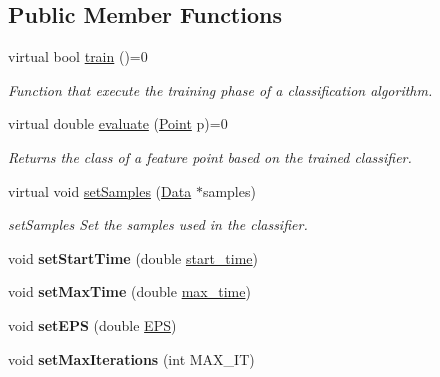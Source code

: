\subsection*{Public Member Functions}
\begin{DoxyCompactItemize}
\item 
virtual bool \hyperlink{class_classifier_a2306a5de27555ab093593ac9642bc7d9}{train} ()=0
\begin{DoxyCompactList}\small\item\em Function that execute the training phase of a classification algorithm. \end{DoxyCompactList}\item 
virtual double \hyperlink{class_classifier_ae8e9554823b85ddc2dcad2955da811d9}{evaluate} (\hyperlink{class_point}{Point} p)=0
\begin{DoxyCompactList}\small\item\em Returns the class of a feature point based on the trained classifier. \end{DoxyCompactList}\item 
virtual void \hyperlink{class_classifier_a4b16736670cba8f4c8397b6a90c8c799}{set\+Samples} (\hyperlink{class_data}{Data} $\ast$samples)
\begin{DoxyCompactList}\small\item\em set\+Samples Set the samples used in the classifier. \end{DoxyCompactList}\item 
\mbox{\label{class_classifier_a7f1cf3ac53b0593307a050368a912bb4}} 
void {\bfseries set\+Start\+Time} (double \hyperlink{class_classifier_a4488a20bd7b4fc22d57244aaee57b002}{start\+\_\+time})
\item 
\mbox{\label{class_classifier_a5da324a0de94b7171484f3b1f1f22fbd}} 
void {\bfseries set\+Max\+Time} (double \hyperlink{class_classifier_ae5ada7ce4d5436d1dcff3dff458107fd}{max\+\_\+time})
\item 
\mbox{\label{class_classifier_a9cc5a1d92243f9d9b530347be1ac7367}} 
void {\bfseries set\+E\+PS} (double \hyperlink{class_classifier_ad7cd0cfea68461340df2adb0c132dc93}{E\+PS})
\item 
\mbox{\label{class_classifier_a58540f77a22c0f1774d0089fac713498}} 
void {\bfseries set\+Max\+Iterations} (int M\+A\+X\+\_\+\+IT)

\end{DoxyCompactItemize}
